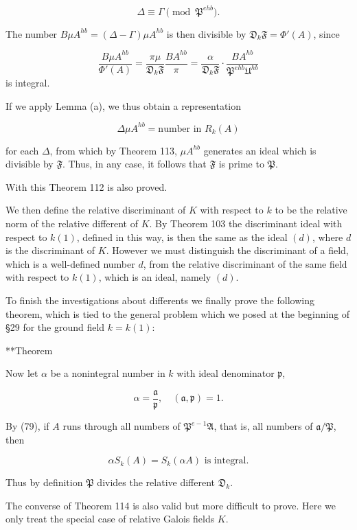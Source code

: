 $$\Delta \equiv \Gamma \pmod{\mathfrak{P}^{ehb}}.$$

The number $B\mu A^{hb} = (\Delta - \Gamma)\mu A^{hb}$ is then divisible by $\mathfrak{D}_k\mathfrak{F} = \Phi'(A)$, since

$$\frac{B\mu A^{hb}}{\Phi'(A)} = \frac{\pi\mu}{\mathfrak{D}_k\mathfrak{F}} \frac{BA^{hb}}{\pi} = \frac{\alpha}{\mathfrak{D}_k\mathfrak{F}} \cdot \frac{BA^{hb}}{\mathfrak{P}^{ehb}\mathfrak{U}^{hb}}$$ is integral.

If we apply Lemma (a), we thus obtain a representation

$$\Delta\mu A^{hb} = \text{number in } R_k(A)$$

for each $\Delta$, from which by Theorem 113, $\mu A^{hb}$ generates an ideal which is divisible by $\mathfrak{F}$. Thus, in any case, it follows that $\mathfrak{F}$ is prime to $\mathfrak{P}$.

With this Theorem 112 is also proved.

We then define the relative discriminant of $K$ with respect to $k$ to be the relative norm of the relative different of $K$. By Theorem 103 the discriminant ideal with respect to $k(1)$, defined in this way, is then the same as the ideal $(d)$, where $d$ is the discriminant of $K$. However we must distinguish the discriminant of a field, which is a well-defined number $d$, from the relative discriminant of the same field with respect to $k(1)$, which is an ideal, namely $(d)$.

To finish the investigations about differents we finally prove the following theorem, which is tied to the general problem which we posed at the beginning of §29 for the ground field $k = k(1)$:

**Theorem

Now let $\alpha$ be a nonintegral number in $k$ with ideal denominator $\mathfrak{p}$,

$$\alpha = \frac{\mathfrak{a}}{\mathfrak{p}}, \quad (\mathfrak{a}, \mathfrak{p}) = 1.$$

By (79), if $A$ runs through all numbers of $\mathfrak{P}^{e-1}\mathfrak{A}$, that is, all numbers of $\mathfrak{a}/\mathfrak{P}$, then

$$\alpha S_k(A) = S_k(\alpha A) \text{ is integral.}$$

Thus by definition $\mathfrak{P}$ divides the relative different $\mathfrak{D}_k$.

The converse of Theorem 114 is also valid but more difficult to prove. Here we only treat the special case of relative Galois fields $K$.


